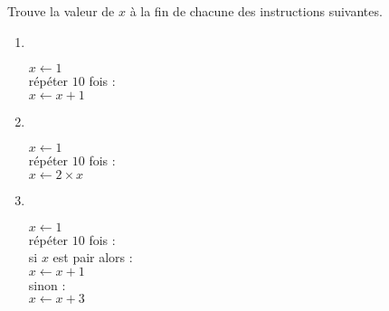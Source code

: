 \documentclass[class=report,crop=false, 12pt]{standalone}
\begin{document}
\begin{activite}
Trouve la valeur de $x$ à la fin de chacune des instructions suivantes.

\begin{enumerate}
  \item ~ \\
  \begin{minipage}{0.3\textwidth}
$x \leftarrow 1$ \\
répéter $10$ fois : \\
\indentation $x \leftarrow x + 1$
\end{minipage}
  
  \item ~ \\
  \begin{minipage}{0.3\textwidth}
$x \leftarrow 1$ \\
répéter $10$ fois : \\
\indentation $x \leftarrow 2 \times x$
\end{minipage}

  \item ~ \\
  \begin{minipage}{0.3\textwidth}
$x \leftarrow 1$ \\
répéter $10$ fois : \\
\indentation si $x$ est pair alors : \\ 
\indentation\indentation $x \leftarrow x + 1$ \\
\indentation sinon : \\
\indentation\indentation $x \leftarrow x + 3$
\end{minipage}
  
\end{enumerate}



\end{activite}
\end{document}
